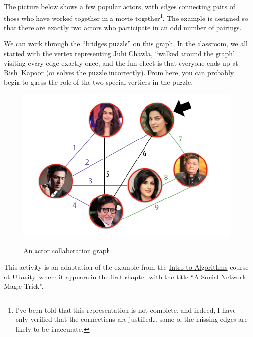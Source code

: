 \documentclass[
  letterpaper,
  DIV=11,
  numbers=noendperiod]{scrreprt}
\begin{document}
\begin{tcolorbox}[standard jigsaw,toptitle=1mm, titlerule=0mm, bottomtitle=1mm, title=\textcolor{quarto-callout-note-color}{\faInfo}\hspace{0.5em}{Classroom Activity with Eulerian Paths}, coltitle=black, colback=white, toprule=.15mm, colframe=quarto-callout-note-color-frame, arc=.35mm, rightrule=.15mm, opacityback=0, left=2mm, leftrule=.75mm, colbacktitle=quarto-callout-note-color!10!white, opacitybacktitle=0.6, bottomrule=.15mm]
The picture below shows a few popular actors, with edges connecting
pairs of those who have worked together in a movie together\footnote{I've
  been told that this representation is not complete, and indeed, I have
  only verified that the connections are justified\ldots{} some of the
  missing edges are likely to be inaccurate.}. The example is designed
so that there are exactly two actors who participate in an odd number of
pairings.

We can work through the ``bridges puzzle'' on this graph. In the
classroom, we all started with the vertex representing Juhi Chawla,
``walked around the graph'' visiting every edge exactly once, and the
fun effect is that everyone ends up at Rishi Kapoor (or solves the
puzzle incorrectly). From here, you can probably begin to guess the role
of the two special vertices in the puzzle.

\begin{figure}
{\centering \includegraphics{./figures/ch3-eulerpath.png}
}

\caption{An actor collaboration graph}

\end{figure}

This activity is an adaptation of the example from the
\href{https://www.udacity.com/course/intro-to-algorithms--cs215}{Intro
to Algorithms} course at Udacity, where it appears in the first chapter
with the title ``A Social Network Magic Trick''.
\end{tcolorbox}
\end{document}
